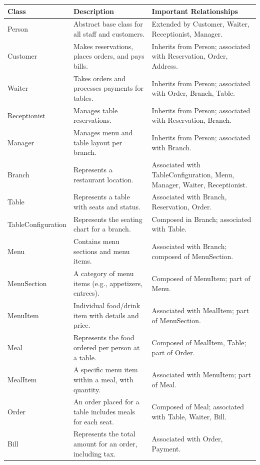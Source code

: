 \begin{table}[h!]
\centering
\begin{tabularx}{\textwidth}{|X|X|X|}
\hline
\textbf{Class} & \textbf{Description} & \textbf{Important Relationships} \\
\hline
Person & Abstract base class for all staff and customers. & Extended by Customer, Waiter, Receptionist, Manager. \\
\hline
Customer & Makes reservations, places orders, and pays bills. & Inherits from Person; associated with Reservation, Order, Address. \\
\hline
Waiter & Takes orders and processes payments for tables. & Inherits from Person; associated with Order, Branch, Table. \\
\hline
Receptionist & Manages table reservations. & Inherits from Person; associated with Reservation, Branch. \\
\hline
Manager & Manages menu and table layout per branch. & Inherits from Person; associated with Branch. \\
\hline
Branch & Represents a restaurant location. & Associated with TableConfiguration, Menu, Manager, Waiter, Receptionist. \\
\hline
Table & Represents a table with seats and status. & Associated with Branch, Reservation, Order. \\
\hline
TableConfiguration & Represents the seating chart for a branch. & Composed in Branch; associated with Table. \\
\hline
Menu & Contains menu sections and menu items. & Associated with Branch; composed of MenuSection. \\
\hline
MenuSection & A category of menu items (e.g., appetizers, entrees). & Composed of MenuItem; part of Menu. \\
\hline
MenuItem & Individual food/drink item with details and price. & Associated with MealItem; part of MenuSection. \\
\hline
Meal & Represents the food ordered per person at a table. & Composed of MealItem, Table; part of Order. \\
\hline
MealItem & A specific menu item within a meal, with quantity. & Associated with MenuItem; part of Meal. \\
\hline
Order & An order placed for a table includes meals for each seat. & Composed of Meal; associated with Table, Waiter, Bill. \\
\hline
Bill & Represents the total amount for an order, including tax. & Associated with Order, Payment. \\

\end{tabularx}
\end{table}
